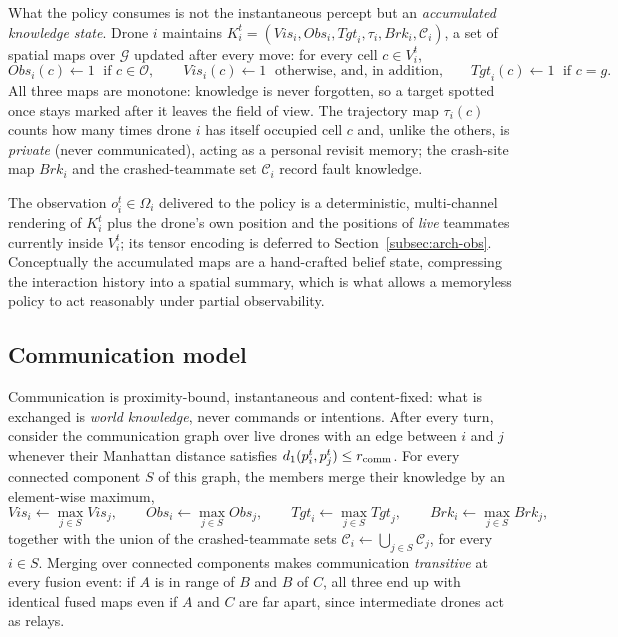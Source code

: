 What the policy consumes is not the instantaneous percept but an
\emph{accumulated knowledge state}. Drone $i$ maintains
$K_i^t = (\mathit{Vis}_i, \mathit{Obs}_i, \mathit{Tgt}_i, \tau_i,
\mathit{Brk}_i, \mathcal{C}_i)$, a set of spatial maps over $\mathcal{G}$
updated after every move: for every cell $c \in V_i^t$,
\[
\mathit{Obs}_i(c) \leftarrow 1 \;\text{ if } c \in \mathcal{O}, \qquad
\mathit{Vis}_i(c) \leftarrow 1 \;\text{ otherwise, and, in addition,} \qquad
\mathit{Tgt}_i(c) \leftarrow 1 \;\text{ if } c = g.
\]
All three maps are monotone: knowledge is never forgotten, so a target spotted
once stays marked after it leaves the field of view. The trajectory map
$\tau_i(c)$ counts how many times drone $i$ has itself occupied cell $c$ and,
unlike the others, is \emph{private} (never communicated), acting as a personal
revisit memory; the crash-site map $\mathit{Brk}_i$ and the crashed-teammate set
$\mathcal{C}_i$ record fault knowledge.

The observation $o_i^t \in \Omega_i$ delivered to the policy is a deterministic,
multi-channel rendering of $K_i^t$ plus the drone's own position and the
positions of \emph{live} teammates currently inside $V_i^t$; its tensor encoding
is deferred to Section~\ref{subsec:arch-obs}. Conceptually the accumulated maps
are a hand-crafted belief state, compressing the interaction history into a
spatial summary, which is what allows a memoryless policy to act reasonably under
partial observability.

\subsection{Communication model}
\label{subsec:prob-comm}

Communication is proximity-bound, instantaneous and content-fixed: what is
exchanged is \emph{world knowledge}, never commands or intentions. After every
turn, consider the communication graph over live drones with an edge between $i$
and $j$ whenever their Manhattan distance satisfies
$d_1(p_i^t, p_j^t) \le r_{\mathrm{comm}}$. For every connected component $S$ of this graph,
the members merge their knowledge by an element-wise maximum,
\[
\mathit{Vis}_i \leftarrow \max_{j \in S} \mathit{Vis}_j, \qquad
\mathit{Obs}_i \leftarrow \max_{j \in S} \mathit{Obs}_j, \qquad
\mathit{Tgt}_i \leftarrow \max_{j \in S} \mathit{Tgt}_j, \qquad
\mathit{Brk}_i \leftarrow \max_{j \in S} \mathit{Brk}_j,
\]
together with the union of the crashed-teammate sets
$\mathcal{C}_i \leftarrow \bigcup_{j \in S} \mathcal{C}_j$, for every
$i \in S$. Merging over connected components makes communication
\emph{transitive} at every fusion event: if $A$ is in range of $B$ and $B$ of $C$, all
three end up with identical fused maps even if $A$ and $C$ are far apart, since
intermediate drones act as relays.

